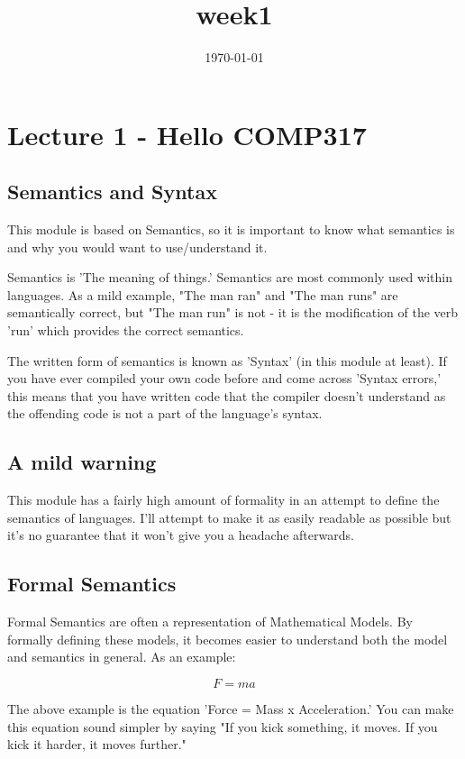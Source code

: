 \documentclass[12pt]{article}
\date{\today}
\title{week1}
\begin{document}
\maketitle
\tableofcontents


\section{Lecture 1 - Hello COMP317}
\label{sec-1}
\subsection{Semantics and Syntax}
\label{sec-1-1}
This module is based on Semantics, so it is important to know what semantics is
and why you would want to use/understand it.

Semantics is 'The meaning of things.'  Semantics are most commonly used within
languages.  As a mild example, "The man ran" and "The man runs" are
semantically correct, but "The man run" is not - it is the modification of the
verb 'run' which provides the correct semantics.

The written form of semantics is known as 'Syntax' (in this module at least).
If you have ever compiled your own code before and come across 'Syntax errors,'
this means that you have written code that the compiler doesn't understand as
the offending code is not a part of the language's syntax.

\subsection{A mild warning}
\label{sec-1-2}
This module has a fairly high amount of formality in an attempt to define
the semantics of languages.  I'll attempt to make it as easily readable as
possible but it's no guarantee that it won't give you a headache afterwards.

\subsection{Formal Semantics}
\label{sec-1-3}
Formal Semantics are often a representation of Mathematical Models.  By
formally defining these models, it becomes easier to understand both the model
and semantics in general.  As an example:

\begin{equation}
F = ma
\end{equation}

The above example is the equation 'Force = Mass x Acceleration.'  You can make
this equation sound simpler by saying "If you kick something, it moves.  If you
kick it harder, it moves further."
\end{document}

